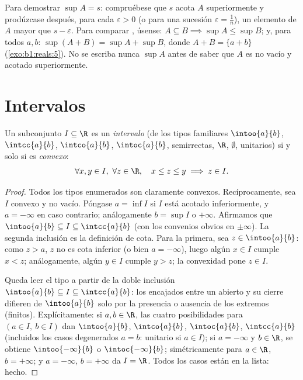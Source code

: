 \begin{method}\label{met:b1:reals:supproofs}
Para demostrar $\sup A = s$: compruébese que $s$ acota $A$
superiormente y prodúzcase después, para cada $\varepsilon > 0$ (o
para una sucesión $\varepsilon = \frac 1n$), un elemento de $A$ mayor
que $s - \varepsilon$. Para comparar , úsense:
$A \subseteq B \implies \sup A \leq \sup B$; y, para todos $a, b$:
$\sup(A + B) = \sup A + \sup B$, donde $A + B = \{a + b\}$
(\cref{exo:b1:reals:5}). No se escriba nunca $\sup A$ antes de saber
que $A$ es no vacío y acotado superiormente.
\end{method}

\section{Intervalos}

\begin{proposition}\label{prop:b1:reals:intervals}
Un subconjunto $I \subseteq \R$ es un \emph{intervalo}
(de los tipos familiares $\intoo{a}{b}$, $\intcc{a}{b}$,
$\intco{a}{b}$, $\intoc{a}{b}$, semirrectas, $\R$, $\emptyset$,
 unitarios) si y solo si es \emph{convexo}:
\[
\forall x, y \in I,\ \forall z \in \R, \quad
x \leq z \leq y \implies z \in I .
\]
\end{proposition}

\begin{proof}
Todos los tipos enumerados son claramente convexos. Recíprocamente,
sea $I$ convexo y no vacío. Póngase $a = \inf I$ si $I$ está acotado
inferiormente, y $a = -\infty$ en caso contrario; análogamente
$b = \sup I$ o $+\infty$. Afirmamos que $\intoo{a}{b} \subseteq I
\subseteq \intcc{a}{b}$ (con los convenios obvios en $\pm\infty$). La
segunda inclusión es la definición de cota. Para la primera, sea
$z \in \intoo{a}{b}$: como $z > a$, $z$ no es cota inferior (o bien
$a = -\infty$), luego algún $x \in I$ cumple $x < z$; análogamente,
algún $y \in I$ cumple $y > z$; la convexidad pone $z \in I$.

Queda leer el tipo a partir de la doble inclusión
$\intoo{a}{b} \subseteq I \subseteq \intcc{a}{b}$: los 
encajados entre un  abierto y su cierre difieren de
$\intoo{a}{b}$ solo por la presencia o ausencia de los extremos
(finitos). Explícitamente: si $a, b \in \R$, las cuatro posibilidades
para $(a \in I,\ b \in I)$ dan $\intoo{a}{b}$, $\intco{a}{b}$,
$\intoc{a}{b}$, $\intcc{a}{b}$ (incluidos los casos degenerados
$a = b$:  unitario si $a \in I$); si $a = -\infty$ y
$b \in \R$, se obtiene $\intoo{-\infty}{b}$ o $\intoc{-\infty}{b}$;
simétricamente para $a \in \R$, $b = +\infty$; y $a = -\infty$,
$b = +\infty$ da $I = \R$. Todos los casos están en la lista: hecho.
\end{proof}


